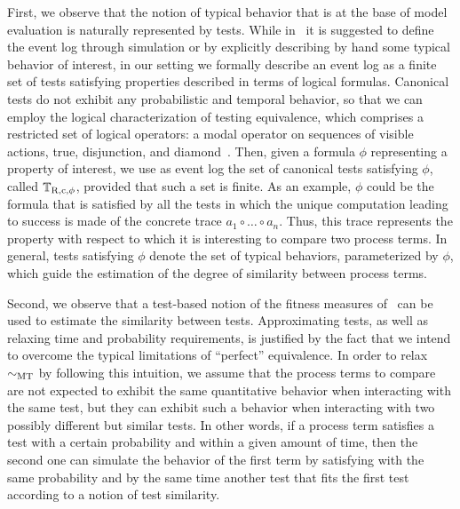\documentclass[copyright,creativecommons]{eptcs}
\newcommand{\tests}
	{\mathbb{T}}
\newcommand{\sbis}[1]
	{\sim_{#1}}
\begin{document}
First, we observe that the notion of typical behavior that is at the base of model evaluation is naturally represented by tests.
While in~\cite{AAW} it is suggested to define the event log through simulation or by explicitly describing by hand some 
typical behavior of interest, in our setting we formally describe an event log as a finite set of tests satisfying properties 
described in terms of logical formulas. Canonical tests do not exhibit any probabilistic and temporal behavior, so that  
we can employ the logical characterization of testing equivalence, which comprises a restricted set of logical 
operators: a modal operator on sequences of visible actions, true, disjunction, and diamond~\cite{ABC}. Then, given a formula 
$\phi$ representing a property of interest, we use as event log the set of canonical tests satisfying $\phi$, called 
$\tests_{\rm R,c,\phi}$, provided that such a set is finite. As an example, $\phi$ could be the formula 
that is satisfied by all the tests in which the unique computation leading to success is made of the concrete trace 
$a_1 \circ \ldots \circ a_n$. Thus, this trace represents the property with respect to which it is interesting to compare two 
process terms.
In general, tests satisfying $\phi$ denote the set of typical behaviors, parameterized by $\phi$, which guide the estimation of 
the degree of similarity between process terms.

Second, we observe that a test-based notion of the fitness measures of~\cite{AAW} can be used to estimate the similarity between
tests. Approximating tests, as well as relaxing time and probability requirements, is justified by the fact that we intend to
overcome the typical limitations of ``perfect'' equivalence.
In order to relax $\sbis{\rm MT}$ by following this intuition, we assume that the process terms to compare are not expected to 
exhibit the same quantitative behavior when interacting with the same test, but they can exhibit such a behavior when 
interacting with two possibly different but similar tests. 
In other words, if a process term satisfies a test with a certain probability and within a given amount of time, then the second 
one can simulate the behavior of the first term by satisfying with the same probability and by the same time another test that 
fits the first test according to a notion of test similarity.
\end{document}
